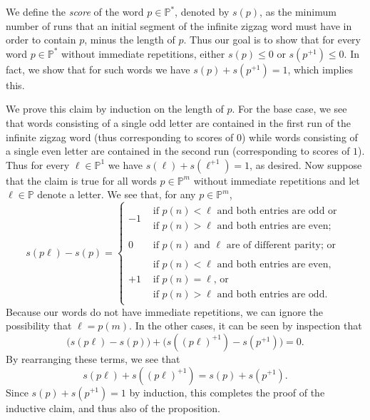 \newenvironment{proof-of-prop-miller-words}{%
	\medskip\noindent {\it Proof of Proposition~\ref{prop-miller-words}.\/}%
}{%
	\qed\bigskip%
}
%
\begin{proof-of-prop-miller-words}
	We define the \emph{score} of the word $p\in\mathbb{P}^\ast$, denoted by $s(p)$, as the minimum number of runs that an initial segment of the infinite zigzag word must have in order to contain $p$, minus the length of $p$. Thus our goal is to show that for every word $p\in\mathbb{P}^\ast$ without immediate repetitions, either $s(p)\le 0$ or $s(p^{+1})\le 0$. In fact, we show that for such words we have $s(p)+s(p^{+1})=1$, which implies this.

	We prove this claim by induction on the length of $p$. For the base case, we see that words consisting of a single odd letter are contained in the first run of the infinite zigzag word (thus corresponding to scores of $0$) while words consisting of a single even letter are contained in the second run (corresponding to scores of $1$). Thus for every $\ell\in\mathbb{P}^1$ we have $s(\ell)+s(\ell^{+1})=1$, as desired. Now suppose that the claim is true for all words $p\in\mathbb{P}^m$ without immediate repetitions and let $\ell\in\mathbb{P}$ denote a letter. We see that, for any $p \in \mathbb{P}^m$,
	\[
		s(p\ell)-s(p)
		=
		\left\{
		\begin{array}{cl}
			-1&	\begin{array}{l}
				\text{if $p(n)<\ell$ and both entries are odd or}\\
				\text{if $p(n)>\ell$ and both entries are even;}
				\end{array}
			\\[12pt]
			0&	\begin{array}{l}
				\text{if $p(n)$ and $\ell$ are of different parity; or}
				\end{array}
			\\[8pt]
			+1&	\begin{array}{l}
				\text{if $p(n)<\ell$ and both entries are even,}\\
				\text{if $p(n)=\ell$, or}\\
				\text{if $p(n)>\ell$ and both entries are odd.}
				\end{array}
		\end{array}
		\right.
	\]
	Because our words do not have immediate repetitions, we can ignore the possibility that $\ell=p(m)$. In the other cases, it can be seen by inspection that
	\[
		\big(  s(p\ell)-s(p)  \big)
		+
		\big(  s\!\left((p\ell)^{+1}\right) - s\!\left(p^{+1}\right)\!  \big)
		=
		0.
	\]
	By rearranging these terms, we see that
	\[
		s(p\ell) + s\!\left((p\ell)^{+1}\right)
		=
		s(p)+s\!\left(p^{+1}\right).
	\]
	Since $s(p)+s\!\left(p^{+1}\right)=1$ by induction, this completes the proof of the inductive claim, and thus also of the proposition.
\end{proof-of-prop-miller-words}

